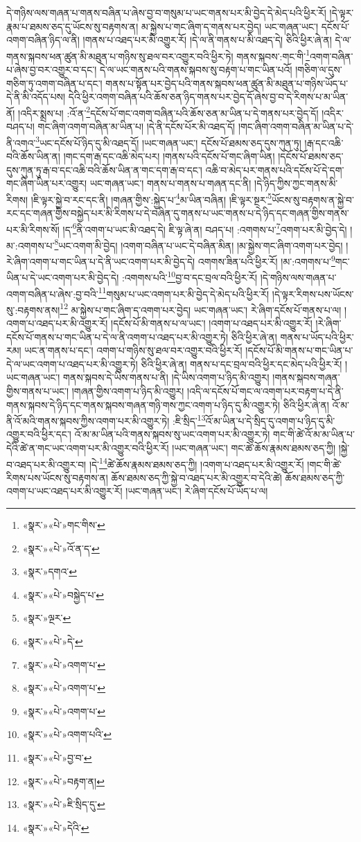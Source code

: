 དེ་གཉིས་ལས་གཞན་པ་གནས་བཞིན་པ་ཞེས་བྱ་བ་གསུམ་པ་ཡང་གནས་པར་མི་བྱེད་དེ་མེད་པའི་ཕྱིར་རོ། །དེ་ལྟར་རྣམ་པ་ཐམས་ཅད་དུ་ཡོངས་སུ་བརྟགས་ན། མ་སྐྱེས་པ་གང་ཞིག་ད་གནས་པར་བྱེད། ཡང་གཞན་ཡང་། དངོས་པོ་འགག་བཞིན་ཉིད་ལ་ནི། །གནས་པ་འཐད་པར་མི་འགྱུར་རོ། །དེ་ལ་ནི་གནས་པ་མི་འཐད་དེ། ཅིའི་ཕྱིར་ཞེ་ན། དེ་ལ་གནས་སྐབས་ཕན་ཚུན་མི་མཐུན་པ་གཉིས་སུ་ཐལ་བར་འགྱུར་བའི་ཕྱིར་ཏེ། གནས་སྐབས་:གང་གི་\footnote{«སྣར་»«པེ་»གང་གིས་}འགག་བཞིན་པ་ཞེས་བྱ་བར་འགྱུར་བ་དང་། དེ་ལ་ཡང་གནས་པའི་གནས་སྐབས་སུ་བརྟག་པ་གང་ཡིན་པའོ། །གཅིག་ལ་དུས་གཅིག་ཏུ་འགག་བཞིན་པ་དང་། གནས་པ་སྟོན་པར་བྱེད་པའི་གནས་སྐབས་ཕན་ཚུན་མི་མཐུན་པ་གཉིས་ཡོད་པ་དེ་ནི་མི་འདོད་པས། དེའི་ཕྱིར་འགག་བཞིན་པའི་ཆོས་ཅན་ཉིད་གནས་པར་བྱེད་དོ་ཞེས་བྱ་བ་དེ་རིགས་པ་མ་ཡིན་ནོ། །འདིར་སྨྲས་པ། :འོ་ན་\footnote{«སྣར་»«པེ་»འོ་ན་ད་}དངོས་པོ་གང་འགག་བཞིན་པའི་ཆོས་ཅན་མ་ཡིན་པ་དེ་གནས་པར་བྱེད་དོ། །འདིར་བཤད་པ། གང་ཞིག་འགག་བཞིན་མ་ཡིན་པ། །དེ་ནི་དངོས་པོར་མི་འཐད་དོ། །གང་ཞིག་འགག་བཞིན་མ་ཡིན་པ་དེ་ནི་འགའ་\footnote{«སྣར་»དགའ་}ཡང་དངོས་པོ་ཉིད་དུ་མི་འཐད་དོ། །ཡང་གཞན་ཡང་། དངོས་པོ་ཐམས་ཅད་དུས་ཀུན་ཏུ། །རྒ་དང་འཆི་བའི་ཆོས་ཡིན་ན། །གང་དག་རྒ་དང་འཆི་མེད་པར། །གནས་པའི་དངོས་པོ་གང་ཞིག་ཡིན། །དངོས་པོ་ཐམས་ཅད་དུས་ཀུན་ཏུ་རྒ་བ་དང་འཆི་བའི་ཆོས་ཡིན་ན་གང་དག་རྒ་བ་དང་། འཆི་བ་མེད་པར་གནས་པའི་དངོས་པོ་དེ་དག་གང་ཞིག་ཡིན་པར་འགྱུར། ཡང་གཞན་ཡང་། གནས་པ་གནས་པ་གཞན་དང་ནི། །དེ་ཉིད་ཀྱིས་ཀྱང་གནས་མི་རིགས། །ཇི་ལྟར་སྐྱེ་བ་རང་དང་ནི། །གཞན་གྱིས་:སྐྱེད་པ་\footnote{«སྣར་»«པེ་»བསྐྱེད་པ་}མ་ཡིན་བཞིན། །ཇི་ལྟར་སྔར་\footnote{«སྣར་»ལྔར་}ཡོངས་སུ་བརྟགས་ན་སྐྱེ་བ་རང་དང་གཞན་གྱིས་བསྐྱེད་པར་མི་རིགས་པ་དེ་བཞིན་དུ་གནས་པ་ཡང་གནས་པ་དེ་ཉིད་དང་གཞན་གྱིས་གནས་པར་མི་རིགས་སོ། །ད་\footnote{«སྣར་»«པེ་»དེ་}ནི་འགག་པ་ཡང་མི་འཐད་དེ། ཇི་ལྟ་ཞེ་ན། བཤད་པ། :འགགས་པ་\footnote{«སྣར་»«པེ་»འགག་པ་}འགག་པར་མི་བྱེད་དེ། །མ་:འགགས་པ་\footnote{«སྣར་»«པེ་»འགག་པ་}ཡང་འགག་མི་བྱེད། །འགག་བཞིན་པ་ཡང་དེ་བཞིན་མིན། །མ་སྐྱེས་གང་ཞིག་འགག་པར་བྱེད། །རེ་ཞིག་འགག་པ་གང་ཡིན་པ་དེ་ནི་ཡང་འགག་པར་མི་བྱེད་དེ། འགགས་ཟིན་པའི་ཕྱིར་རོ། །མ་:འགགས་པ་\footnote{«སྣར་»«པེ་»འགག་པ་}གང་ཡིན་པ་དེ་ཡང་འགག་པར་མི་བྱེད་དེ། :འགགས་པའི་\footnote{«སྣར་»«པེ་»འགག་པའི་}བྱ་བ་དང་བྲལ་བའི་ཕྱིར་རོ། །དེ་གཉིས་ལས་གཞན་པ་འགག་བཞིན་པ་ཞེས་:བྱ་བའི་\footnote{«སྣར་»«པེ་»བྱ་བ་}གསུམ་པ་ཡང་འགག་པར་མི་བྱེད་དེ་མེད་པའི་ཕྱིར་རོ། །དེ་ལྟར་རིགས་པས་ཡོངས་སུ་:བརྟགས་ནས།\footnote{«སྣར་»«པེ་»བརྟག་ན།} མ་སྐྱེས་པ་གང་ཞིག་ད་འགག་པར་བྱེད། ཡང་གཞན་ཡང་། རེ་ཞིག་དངོས་པོ་གནས་པ་ལ། །འགག་པ་འཐད་པར་མི་འགྱུར་རོ། །དངོས་པོ་མི་གནས་པ་ལ་ཡང་། །འགག་པ་འཐད་པར་མི་འགྱུར་རོ། །རེ་ཞིག་དངོས་པོ་གནས་པ་གང་ཡིན་པ་དེ་ལ་ནི་འགག་པ་འཐད་པར་མི་འགྱུར་ཏེ། ཅིའི་ཕྱིར་ཞེ་ན། གནས་པ་ཡོད་པའི་ཕྱིར་རམ། ཡང་ན་གནས་པ་དང་། འགག་པ་གཉིས་སུ་ཐལ་བར་འགྱུར་བའི་ཕྱིར་རོ། །དངོས་པོ་མི་གནས་པ་གང་ཡིན་པ་དེ་ལ་ཡང་འགག་པ་འཐད་པར་མི་འགྱུར་ཏེ། ཅིའི་ཕྱིར་ཞེ་ན། གནས་པ་དང་བྲལ་བའི་ཕྱིར་དང་མེད་པའི་ཕྱིར་རོ། །ཡང་གཞན་ཡང་། གནས་སྐབས་དེ་ཡིས་གནས་པ་ནི། །དེ་ཡིས་འགག་པ་ཉིད་མི་འགྱུར། །གནས་སྐབས་གཞན་གྱིས་གནས་པ་ཡང་། །གཞན་གྱིས་འགག་པ་ཉིད་མི་འགྱུར། །འདི་ལ་དངོས་པོ་གང་ལ་འགག་པར་བརྟག་པ་དེ་ནི་གནས་སྐབས་དེ་ཉིད་དང་གནས་སྐབས་གཞན་གཉི་གས་ཀྱང་འགག་པ་ཉིད་དུ་མི་འགྱུར་ཏེ། ཅིའི་ཕྱིར་ཞེ་ན། འོ་མ་ནི་འོ་མའི་གནས་སྐབས་ཀྱིས་འགག་པར་མི་འགྱུར་ཏེ། :ཇི་སྲིད་\footnote{«སྣར་»«པེ་»ཇི་སྲིད་དུ་}འོ་མ་ཡིན་པ་དེ་སྲིད་དུ་འགག་པ་ཉིད་དུ་མི་འགྱུར་བའི་ཕྱིར་དང་། འོ་མ་མ་ཡིན་པའི་གནས་སྐབས་སུ་ཡང་འགག་པར་མི་འགྱུར་ཏེ། གང་གི་ཚེ་འོ་མ་མ་ཡིན་པ་དེའི་ཚེ་ན་གང་ཡང་འགག་པར་མི་འགྱུར་བའི་ཕྱིར་རོ། །ཡང་གཞན་ཡང་། གང་ཚེ་ཆོས་རྣམས་ཐམས་ཅད་ཀྱི། །སྐྱེ་བ་འཐད་པར་མི་འགྱུར་བ། །དེ་\footnote{«སྣར་»«པེ་»དེའི་}ཚེ་ཆོས་རྣམས་ཐམས་ཅད་ཀྱི། །འགག་པ་འཐད་པར་མི་འགྱུར་རོ། །གང་གི་ཚེ་རིགས་པས་ཡོངས་སུ་བརྟགས་ན། ཆོས་ཐམས་ཅད་ཀྱི་སྐྱེ་བ་འཐད་པར་མི་འགྱུར་བ་དེའི་ཚེ། ཆོས་ཐམས་ཅད་ཀྱི་འགག་པ་ཡང་འཐད་པར་མི་འགྱུར་རོ། །ཡང་གཞན་ཡང་། རེ་ཞིག་དངོས་པོ་ཡོད་པ་ལ། 